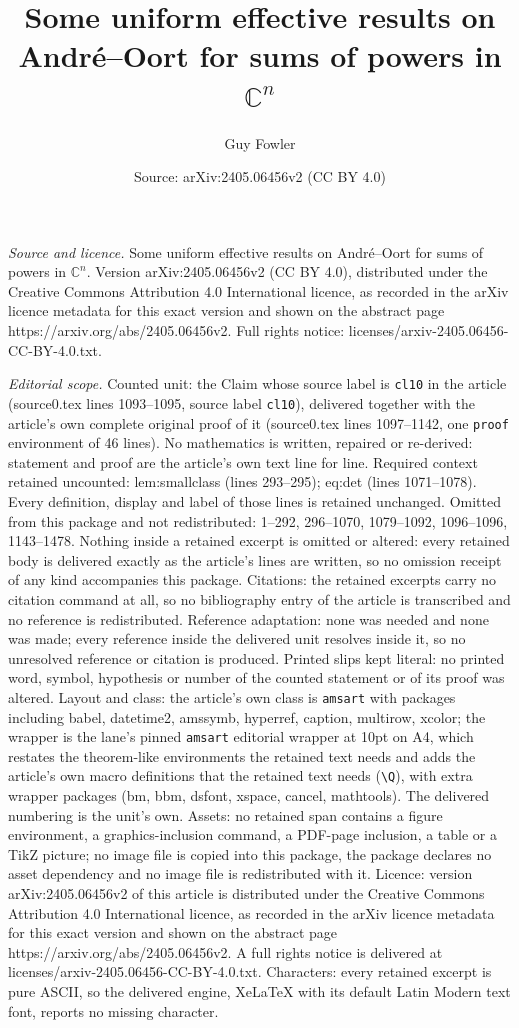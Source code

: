 \documentclass[10pt,a4paper]{amsart}
\title[Some uniform effective results on Andr\'{e}--Oort for sums o]{Some uniform effective results on Andr\'{e}--Oort for sums of powers in $\mathbb{C}^n$}
\author{Guy Fowler}
\date{Source: arXiv:2405.06456v2 (CC BY 4.0)}
\begin{document}
\maketitle

\noindent\emph{Source and licence.} Some uniform effective results on Andr\'{e}--Oort for sums of powers in $\mathbb{C}^n$. Version arXiv:2405.06456v2 (CC BY 4.0), distributed under the Creative Commons Attribution 4.0 International licence, as recorded in the arXiv licence metadata for this exact version and shown on the abstract page https://arxiv.org/abs/2405.06456v2. Full rights notice: licenses/arxiv-2405.06456-CC-BY-4.0.txt.\par\smallskip

\noindent\textit{Editorial scope.} Counted unit: the Claim whose source label is \texttt{cl10} in the article (source0.tex lines 1093--1095, source label \texttt{cl10}), delivered together with the article's own complete original proof of it (source0.tex lines 1097--1142, one \texttt{proof} environment of 46 lines). No mathematics is written, repaired or re-derived: statement and proof are the article's own text line for line. Required context retained uncounted: lem:smallclass (lines 293--295); eq:det (lines 1071--1078). Every definition, display and label of those lines is retained unchanged. Omitted from this package and not redistributed: 1--292, 296--1070, 1079--1092, 1096--1096, 1143--1478. Nothing inside a retained excerpt is omitted or altered: every retained body is delivered exactly as the article's lines are written, so no omission receipt of any kind accompanies this package. Citations: the retained excerpts carry no citation command at all, so no bibliography entry of the article is transcribed and no reference is redistributed. Reference adaptation: none was needed and none was made; every reference inside the delivered unit resolves inside it, so no unresolved reference or citation is produced. Printed slips kept literal: no printed word, symbol, hypothesis or number of the counted statement or of its proof was altered. Layout and class: the article's own class is \texttt{amsart} with packages including babel, datetime2, amssymb, hyperref, caption, multirow, xcolor; the wrapper is the lane's pinned \texttt{amsart} editorial wrapper at 10pt on A4, which restates the theorem-like environments the retained text needs and adds the article's own macro definitions that the retained text needs (\texttt{\textbackslash Q}), with extra wrapper packages (bm, bbm, dsfont, xspace, cancel, mathtools). The delivered numbering is the unit's own. Assets: no retained span contains a figure environment, a graphics-inclusion command, a PDF-page inclusion, a table or a TikZ picture; no image file is copied into this package, the package declares no asset dependency and no image file is redistributed with it. Licence: version arXiv:2405.06456v2 of this article is distributed under the Creative Commons Attribution 4.0 International licence, as recorded in the arXiv licence metadata for this exact version and shown on the abstract page https://arxiv.org/abs/2405.06456v2. A full rights notice is delivered at licenses/arxiv-2405.06456-CC-BY-4.0.txt. Characters: every retained excerpt is pure ASCII, so the delivered engine, XeLaTeX with its default Latin Modern text font, reports no missing character.
\end{document}

